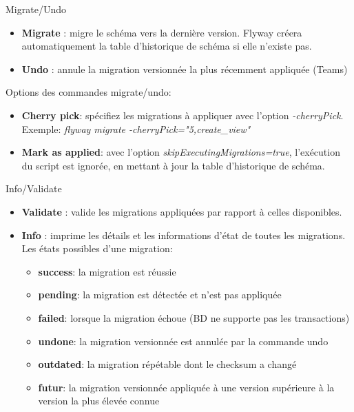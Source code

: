 \documentclass[slidestop,compress,11pt,xcolor=dvipsnames,french]{beamer}
\begin{document}
\begin{frame}{Migrate/Undo}
\begin{itemize}
 \item \textbf{Migrate} : migre le schéma vers la dernière version. Flyway créera automatiquement la table d'historique de schéma si elle n'existe pas.
 \item \textbf{Undo} : annule la migration versionnée la plus récemment appliquée (Teams)
\end{itemize}
\vspace{1cm}
Options des commandes migrate/undo:
\begin{itemize}
 \item \textbf{Cherry pick}: spécifiez les migrations à appliquer avec l'option \textit{-cherryPick}. Exemple: \textit{flyway migrate -cherryPick="5,create\_view"}
 \item \textbf{Mark as applied}: avec l'option \textit{skipExecutingMigrations=true}, 
l'exécution du script est ignorée, en mettant à jour la table d'historique de schéma.
\end{itemize}
\end{frame}
\begin{frame}{Info/Validate}
\begin{itemize}
 \item \textbf{Validate} : valide les migrations appliquées par rapport à celles disponibles.
 \item \textbf{Info} : imprime les détails et les informations d'état de toutes les migrations. Les états possibles d'une migration:
    \begin{itemize}
        \item \textbf{success}: la migration est réussie
        \item \textbf{pending}: la migration est détectée et n'est pas appliquée 
        \item \textbf{failed}: lorsque la migration échoue (BD ne supporte pas les transactions) 
        \item \textbf{undone}: la migration versionnée est annulée par la commande undo
        \item \textbf{outdated}: la migration répétable dont le checksum a changé
        \item \textbf{futur}:  la migration versionnée appliquée à une version supérieure à la version la plus élevée connue
    \end{itemize}
\end{itemize}
\end{frame}
\end{document}
